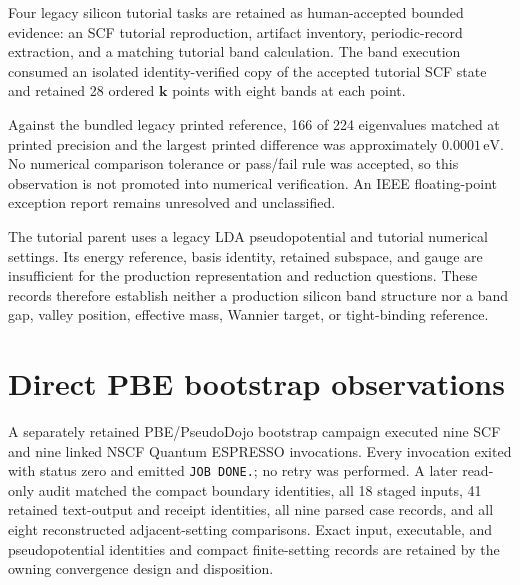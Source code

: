 
Four legacy silicon tutorial tasks are retained as human-accepted bounded
evidence: an SCF tutorial reproduction, artifact inventory, periodic-record
extraction, and a matching tutorial band calculation. The band execution
consumed an isolated identity-verified copy of the accepted tutorial SCF state
and retained 28 ordered $\mathbf k$ points with eight bands at each point.

Against the bundled legacy printed reference, 166 of 224 eigenvalues matched at
printed precision and the largest printed difference was approximately
$0.0001\,\mathrm{eV}$. No numerical comparison tolerance or pass/fail rule was
accepted, so this observation is not promoted into numerical verification. An
IEEE floating-point exception report remains unresolved and unclassified.

The tutorial parent uses a legacy LDA pseudopotential and tutorial numerical
settings. Its energy reference, basis identity, retained subspace, and gauge are
insufficient for the production representation and reduction questions. These
records therefore establish neither a production silicon band structure nor a
band gap, valley position, effective mass, Wannier target, or tight-binding
reference.

\section{Direct PBE bootstrap observations}



A separately retained PBE/PseudoDojo bootstrap campaign executed nine SCF and
nine linked NSCF Quantum ESPRESSO invocations. Every invocation exited with
status zero and emitted \texttt{JOB DONE.}; no retry was performed. A later
read-only audit matched the compact boundary identities, all 18 staged inputs,
41 retained text-output and receipt identities, all nine parsed case records,
and all eight reconstructed adjacent-setting comparisons. Exact input,
executable, and pseudopotential identities and compact finite-setting records
are retained by the owning convergence design and disposition.


